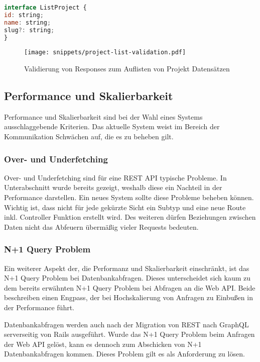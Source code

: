 \begin{lstlisting}[language=Javascript,float=h!,caption={Interface zum Auflisten von Projekten}, label={req:typesafe:listproject}]
interface ListProject {
id: string;
name: string;
slug?: string;
}
\end{lstlisting}

\begin{figure}[h!]
	\centering
	\texttt{[image: snippets/project-list-validation.pdf]}
	\caption{Validierung von Responses zum Auflisten von Projekt Datensätzen}
	\label{req:typesafe:list-validation}
\end{figure}

\subsection{Performance und Skalierbarkeit}
Performance und Skalierbarkeit sind bei der Wahl eines Systems ausschlaggebende Kriterien. Das aktuelle System weist im Bereich der Kommunikation Schwächen auf, die es zu beheben gilt.

\subsubsection{Over- und Underfetching}
Over- und Underfetching sind für eine REST API typische Probleme.
In Unterabschnitt  wurde bereits gezeigt, weshalb diese ein Nachteil in der Performance darstellen.
Ein neues System sollte diese Probleme beheben können.
Wichtig ist, dass nicht für jede gekürzte Sicht ein Subtyp und eine neue Route inkl. Controller Funktion erstellt wird. Des weiteren dürfen Beziehungen zwischen Daten nicht das Abfeuern übermäßig vieler Requests bedeuten.

\subsubsection{N+1 Query Problem}
Ein weiterer Aspekt der, die Performanz und Skalierbarkeit einschränkt, ist das N+1 Query Problem bei Datenbankabfragen. Dieses unterscheidet sich kaum zu dem bereits erwähnten N+1 Query Problem bei Abfragen an die Web API. Beide beschreiben einen Engpass, der bei Hochskalierung von Anfragen zu Einbußen in der Performance führt. 

Datenbankabfragen werden auch nach der Migration von REST nach GraphQL serverseitig von Rails ausgeführt. Wurde das N+1 Query Problem beim Anfragen der Web API gelöst, kann es dennoch zum Abschicken von N+1 Datenbankabfragen kommen.
Dieses Problem gilt es als Anforderung zu lösen.

